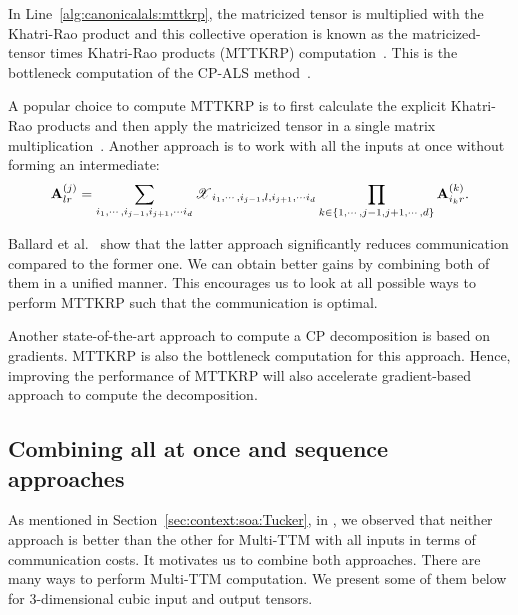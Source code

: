\documentclass[a4paper,11pt]{article}
\newcommand{\X}{\T{X}}
\newcommand{\Y}{\T{Y}}
\newcommand{\allatoncecolor}{\color{purple}}
\newcommand{\seqcolor}{\color{blue}}
\newcommand{\allatoncestart}{{\allatoncecolor\Big(}}
\newcommand{\allatonceend}{{\allatoncecolor\Big)}}
\newcommand{\seqstart}{{\seqcolor\Big(}}
\newcommand{\seqend}{{\seqcolor\Big)}}
\begin{document}
	In Line~\ref{alg:canonicalals:mttkrp}, the matricized tensor is multiplied with the Khatri-Rao product and this collective operation is known as the matricized-tensor times Khatri-Rao products (MTTKRP) computation~\cite{LCPSV-IPDPS-2017}. This is the bottleneck computation of the CP-ALS method~\cite{BNR-IPDPS-2018,LCPSV-IPDPS-2017}.
	
	A popular choice to compute MTTKRP is to first calculate the explicit Khatri-Rao products and then apply the matricized tensor in a single matrix multiplication~\cite{BK-SIAM-2008}. Another approach is to work with all the inputs at once without forming an intermediate: 
	$$\Mn{A}{j}_{lr} = \sum_{i_1,\cdots,i_{j-1},i_{j+1},\cdots i_d}\X_{i_1,\cdots,i_{j-1},l,i_{j+1},\cdots i_d}\prod_{k\in{\{1,\cdots,j-1,j+1,\cdots,d\}}}\Mn{A}{k}_{i_k r}.$$
	
	Ballard et al.~\cite{BNR-IPDPS-2018} show that the latter approach significantly reduces communication compared to the former one. We can obtain better gains by combining both of them in a unified manner. This encourages us to look at all possible ways to perform MTTKRP such that the communication is optimal.
	
	
	Another state-of-the-art approach to compute a CP decomposition is based on gradients. MTTKRP is also the bottleneck computation for this approach. Hence, improving the performance of MTTKRP will also accelerate gradient-based approach to compute the decomposition.
	
	
	\subsection{Combining all at once and sequence approaches}
	\label{sec:combinedapproach}
	
	As mentioned in Section~\ref{sec:context:soa:Tucker}, in \cite{ABGKR-SIMAX-2024}, we observed that neither approach is better than the other for Multi-TTM with all inputs in terms of communication costs. It motivates us to combine both approaches. There are many ways to perform Multi-TTM computation.  We present some of them below for 3-dimensional cubic input and output tensors.	 
	
\end{document}
